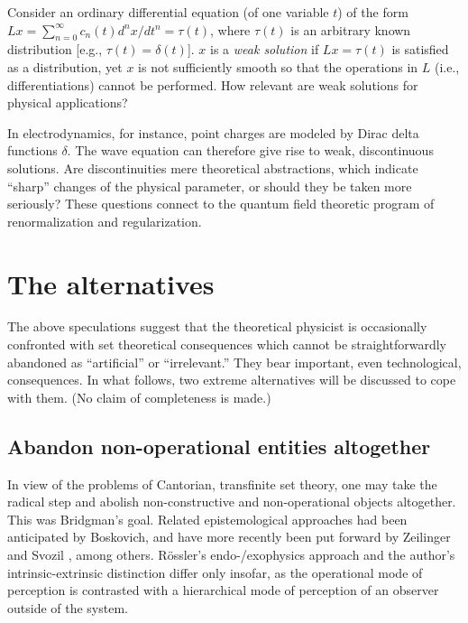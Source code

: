 Consider an ordinary differential equation (of one variable $t$) of the
form
$
Lx= \sum_{n=0}^\infty c_n(t) {d^n x/dt^n}= \tau (t)
 $, where $\tau (t)$ is an arbitrary known distribution [e.g., $\tau
(t)=\delta (t)$].
$x$ is a {\em weak solution}
if $Lx= \tau (t)$ is satisfied as a distribution, yet
$x$ is not sufficiently smooth so that
the operations in $L$ (i.e., differentiations) cannot be performed.
How relevant are weak solutions for physical applications?

In
electrodynamics, for instance, point charges are modeled by Dirac delta
functions $\delta$. The wave equation can therefore give rise to weak,
discontinuous solutions. Are discontinuities mere
theoretical abstractions, which indicate ``sharp'' changes of the
physical parameter, or should they be taken more seriously? These
questions connect to the quantum field theoretic program of
renormalization and regularization.

\section{The alternatives}

The above speculations suggest that the theoretical physicist is
occasionally confronted with set theoretical consequences which cannot
be straightforwardly abandoned as ``artificial'' or ``irrelevant.'' They
bear important, even technological, consequences. In what follows, two
extreme alternatives will be discussed to cope with them. (No claim of
completeness is made.)


\subsection{Abandon non-operational entities altogether}

In view of the problems of Cantorian, transfinite set theory, one may
take the radical step and abolish non-constructive and non-operational
objects altogether.
This was Bridgman's goal.  Related epistemological approaches had been
anticipated by
Boskovich, and have more recently been put forward by
Zeilinger and Svozil
\cite{zeilinger-priv,zeilinger-svozil}, among others.
R\"ossler's \cite{roessler} endo-/exophysics approach and
the
author's \cite{svozil} intrinsic-extrinsic distinction
differ only insofar, as the operational mode of perception is
contrasted with a hierarchical mode of perception of an observer outside
of the system.

